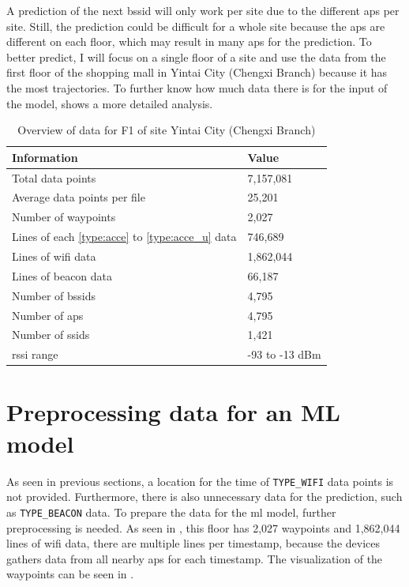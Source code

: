 A prediction of the next \ac{bssid} will only work per site due to the different \acp{ap} per site.
Still, the prediction could be difficult for a whole site because the \acp{ap} are different on each floor, which may result in many \acp{ap} for the prediction.
To better predict, I will focus on a single floor of a site and use the data from the first floor of the shopping mall in Yintai City (Chengxi Branch) because it has the most trajectories.
To further know how much data there is for the input of the model,  shows a more detailed analysis.

\begin{table}[h]
    \centering
    \caption{Overview of data for F1 of site Yintai City (Chengxi Branch)}
    \begin{tabular}{|l|l|}
    \hline
    \textbf{Information} & \textbf{Value} \\ \hline
    Total data points & 7,157,081 \\ \hline
    Average data points per file & 25,201 \\ \hline
    Number of waypoints & 2,027 \\ \hline
    Lines of each \ref{type:acce} to \ref{type:acce_u} data & 746,689 \\ \hline
    Lines of \ac{wifi} data & 1,862,044 \\ \hline
    Lines of beacon data & 66,187 \\ \hline
    Number of \acp{bssid} & 4,795 \\ \hline
    Number of \acp{ap} & 4,795 \\ \hline
    Number of \acp{ssid} & 1,421 \\ \hline
    \ac{rssi} range & -93 to -13 dBm \\ \hline
    \end{tabular}
\label{tab:data_summary}
\end{table}


\section{Preprocessing data for an ML model}\label{sec:prep-on-data-for-an-ml-model}

As seen in previous sections, a location for the time of \texttt{TYPE\_WIFI} data points is not provided.
Furthermore, there is also unnecessary data for the prediction, such as \texttt{TYPE\_BEACON} data.
To prepare the data for the \ac{ml} model, further preprocessing is needed.
As seen in , this floor has 2,027 waypoints and 1,862,044 lines of \ac{wifi} data, there are multiple lines per timestamp, because the devices gathers data from all nearby \acp{ap} for each timestamp.
The visualization of the waypoints can be seen in .

